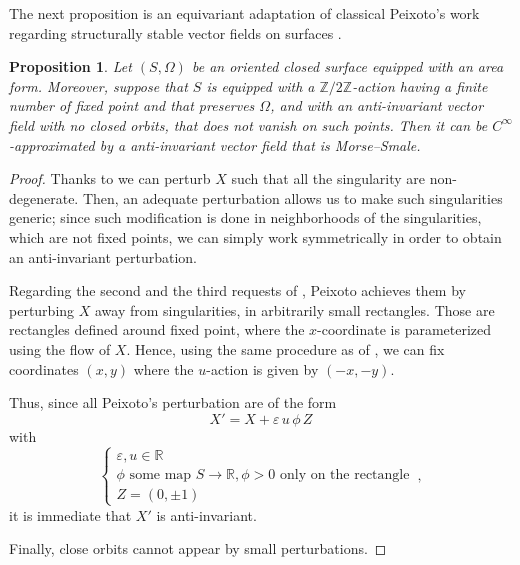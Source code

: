 \documentclass[a4paper, 11pt]{amsart}
\theoremstyle{plain}
\newtheorem{prop}{Proposition}[section]
\theoremstyle{definition}
\newcommand{\R}{\mathbb{R}}
\newcommand{\Z}{\mathbb{Z}}
\renewcommand{\epsilon}{\varepsilon}
\begin{document}
The next proposition is an equivariant adaptation of classical Peixoto's work regarding structurally stable vector fields on surfaces \cite{peixotoStructuralStabilityTwodimensional1962}.
\begin{prop}\label{CinftyMorseSmale}
	Let $(S, \Omega)$ be an oriented closed surface equipped with an area form. Moreover, suppose that $S$ is equipped with a $\Z/2\Z$-action having a finite number of fixed point and that preserves $\Omega$, and with an anti-invariant vector field with no closed orbits, that does not vanish on such points. Then it can be $C^\infty$-approximated by a anti-invariant vector field that is Morse--Smale.
\end{prop}
\begin{proof}
	Thanks to  we can perturb $X$ such that all the singularity are non-degenerate. Then, an adequate perturbation allows us to make such singularities generic; since such modification is done in neighborhoods of the singularities, which are not fixed points, we can simply work symmetrically in order to obtain an anti-invariant perturbation.
	
	Regarding the second and the third requests of , Peixoto achieves them by perturbing $X$ away from singularities, in arbitrarily small rectangles. Those are rectangles defined around fixed point, where the $x$-coordinate is parameterized using the flow of $X$. Hence, using the same procedure as of , we can fix coordinates $(x,y)$ where the $u$-action is given by $(-x,-y)$.
	
	Thus, since all Peixoto's perturbation are of the form
	\[
		X' = X + \epsilon\, u\, \phi\, Z
	\]
	with 
	\[
	\begin{cases}
		\epsilon, u \in \R\\
		\phi \text{ some map } S \to \R, \phi > 0 \text{ only on the rectangle}\\
		Z = (0,\pm1)
	\end{cases}\,,
	\]
	it is immediate that $X'$ is anti-invariant.
	
	Finally, close orbits cannot appear by small perturbations.
\end{proof}
\end{document}
